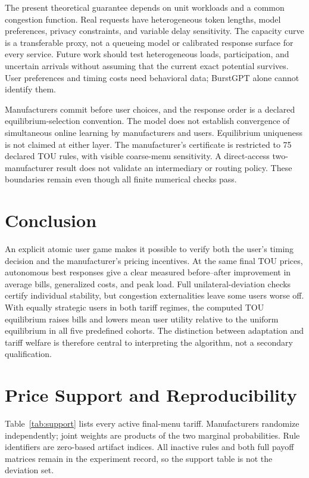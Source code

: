 \documentclass[11pt,a4paper]{article}
\begin{document}
The present theoretical guarantee depends on unit workloads and a common congestion function. Real requests have heterogeneous token lengths, model preferences, privacy constraints, and variable delay sensitivity. The capacity curve is a transferable proxy, not a queueing model or calibrated response surface for every service. Future work should test heterogeneous loads, participation, and uncertain arrivals without assuming that the current exact potential survives. User preferences and timing costs need behavioral data; BurstGPT alone cannot identify them.

Manufacturers commit before user choices, and the response order is a declared equilibrium-selection convention. The model does not establish convergence of simultaneous online learning by manufacturers and users. Equilibrium uniqueness is not claimed at either layer. The manufacturer's certificate is restricted to 75 declared TOU rules, with visible coarse-menu sensitivity. A direct-access two-manufacturer result does not validate an intermediary or routing policy. These boundaries remain even though all finite numerical checks pass.

\section{Conclusion}
An explicit atomic user game makes it possible to verify both the user's timing decision and the manufacturer's pricing incentives. At the same final TOU prices, autonomous best responses give a clear measured before--after improvement in average bills, generalized costs, and peak load. Full unilateral-deviation checks certify individual stability, but congestion externalities leave some users worse off. With equally strategic users in both tariff regimes, the computed TOU equilibrium raises bills and lowers mean user utility relative to the uniform equilibrium in all five predefined cohorts. The distinction between adaptation and tariff welfare is therefore central to interpreting the algorithm, not a secondary qualification.

\appendix
\section{Price Support and Reproducibility}
Table~\ref{tab:support} lists every active final-menu tariff. Manufacturers randomize independently; joint weights are products of the two marginal probabilities. Rule identifiers are zero-based artifact indices. All inactive rules and both full payoff matrices remain in the experiment record, so the support table is not the deviation set.
\end{document}
